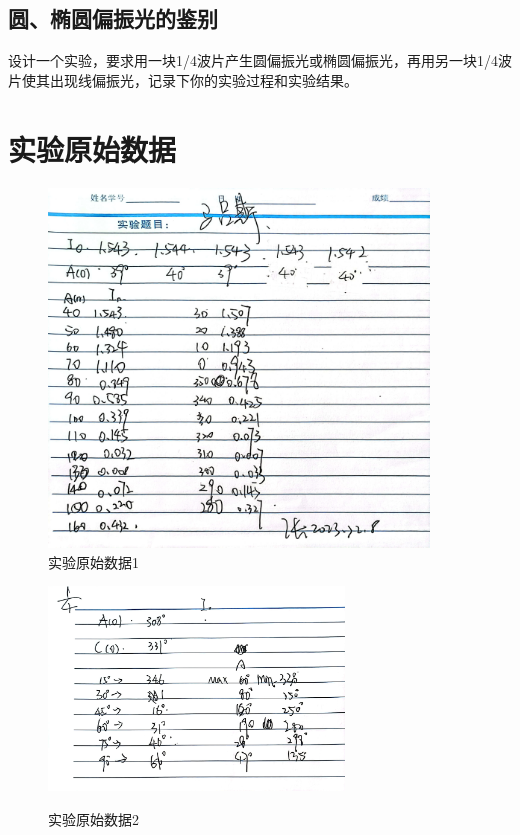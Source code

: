 \documentclass{ctexart}
\begin{document}
  \subsection{圆、椭圆偏振光的鉴别}
  设计一个实验，要求用一块1/4波片产生圆偏振光或椭圆偏振光，再用另一块1/4波片使其出现线偏振光，记录下你的实验过程和实验结果。
\newpage

\section{实验原始数据}
\begin{figure}[H]
  \centering
  \includegraphics[width=0.9\textwidth,height=0.8\textheight]{yuanshishujv2.jpg}
  \caption{实验原始数据1}
\end{figure}
\newpage

\begin{figure}[H]
  \centering \label{shujv2}
  \includegraphics[width=0.7\textwidth,height=0.5\textheight]{yuanshishujv1.jpg}
  \caption{实验原始数据2}
\end{figure}
\newpage
\end{document}
